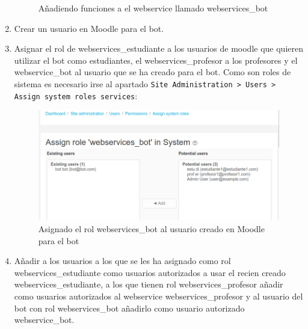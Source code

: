 \begin{enumerate}
\begin{figure}[H]
\caption{Añadiendo funciones a el webservice llamado webservices\_bot }\label{figura415}
\end{figure}



\item Crear un usuario en Moodle para el bot.
\item Asignar el rol de webservices\_estudiante a los usuarios de moodle que quieren utilizar el bot como estudiantes, el webservices\_profesor a los profesores y el webservice\_bot al usuario que se ha creado para el bot. Como son roles de sistema es necesario irse al apartado \texttt{Site Administration > Users > Assign system roles services}:

\begin{figure}[H] %
\centering
\includegraphics[scale=0.3]{imagenes/moodle/Screenshot_2017-08-25_14-40-20.png}  %

\caption{Asignado el rol webservices\_bot al usuario creado en Moodle para el bot }\label{figura418}
\end{figure}

\item Añadir a los usuarios a los que se les ha asignado como rol webservices\_estudiante como usuarios autorizados a usar el recien creado webservices\_estudiante, a los que tienen rol webservices\_profesor añadir como usuarios autorizados al webservice webservices\_profesor y al usuario del bot con rol webservices\_bot añadirlo como usuario autorizado webservice\_bot. 


\end{enumerate}
